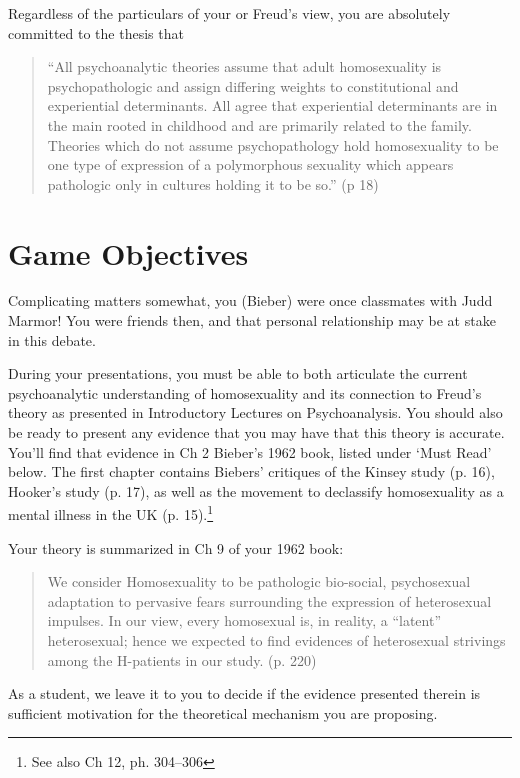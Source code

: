 \begin{refsection}
Regardless of the particulars of your or Freud's view, you are absolutely committed to the thesis that

\begin{quote}

``All psychoanalytic theories assume that adult homosexuality is psychopathologic and assign differing weights to constitutional and experiential determinants. All agree that experiential determinants are in the main rooted in childhood and are primarily related to the family. Theories which do not assume psychopathology hold homosexuality to be one type of expression of a polymorphous sexuality which appears pathologic only in cultures holding it to be so.'' (p 18)
\end{quote}

\section{Game Objectives}
\label{gameobjectives}

Complicating matters somewhat, you (Bieber) were once classmates with Judd Marmor! You were friends then, and that personal relationship may be at stake in this debate.

During your presentations, you must be able to both articulate the current psychoanalytic understanding of homosexuality and its connection to Freud's theory as presented in Introductory Lectures on Psychoanalysis. You should also be ready to present any evidence that you may have that this theory is accurate. You'll find that evidence in Ch 2 Bieber's 1962 book, listed under `Must Read' below. The first chapter contains Biebers' critiques of the Kinsey study (p. 16), Hooker's study (p. 17), as well as the movement to declassify homosexuality as a mental illness in the UK (p. 15).\footnote{See also Ch 12, ph. 304--306}

Your theory is summarized in Ch 9 of your 1962 book:

\begin{quote}

We consider Homosexuality to be pathologic bio-social, psychosexual adaptation to pervasive fears surrounding the expression of heterosexual impulses. In our view, every homosexual is, in reality, a ``latent'' heterosexual; hence we expected to find evidences of heterosexual strivings among the H-patients in our study. (p. 220)
\end{quote}

As a student, we leave it to you to decide if the evidence presented therein is sufficient motivation for the theoretical mechanism you are proposing.


\end{refsection}

